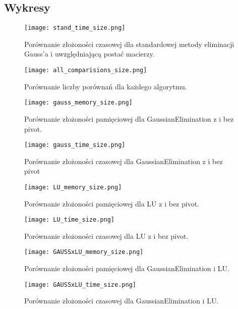 \documentclass[11pt]{article}
\begin{document}
\begin{flushleft}
\subsection{Wykresy}
\centering
\begin{figure}[H]
  \begin{minipage}[b]{.45\textwidth}
    \centering
    \texttt{[image: stand\_time\_size.png]}
    \caption{Porównanie złożoności czasowej dla standardowej metody eliminacji Gauss'a i uwzględniającą postać macierzy.}
  \end{minipage}
    \begin{minipage}[b]{.45\textwidth}
    \centering
    \texttt{[image: all\_comparisions\_size.png]}
    \caption{Porównanie liczby porównań dla każdego algorytmu.}
  \end{minipage}
  \begin{minipage}[b]{.45\textwidth}
    \centering
    \texttt{[image: gauss\_memory\_size.png]}
    \caption{Porównanie złożoności pamięciowej dla GaussianElimination z i bez pivot.}
  \end{minipage}\hfill
  \begin{minipage}[b]{.45\textwidth}
    \centering
    \texttt{[image: gauss\_time\_size.png]}
    \caption{Porównanie złożoności czasowej dla GaussianElimination z i bez pivot}
  \end{minipage}
  \begin{minipage}[b]{.45\textwidth}
    \centering
    \texttt{[image: LU\_memory\_size.png]}
    \caption{Porównanie złożoności pamięciowej dla  LU z i bez pivot.}
  \end{minipage}\hfill
  \begin{minipage}[b]{.45\textwidth}
    \centering
    \texttt{[image: LU\_time\_size.png]}
    \caption{Porównanie złożoności czasowej dla  LU z i bez pivot.}
  \end{minipage}
  \end{figure}
\begin{figure}[H]
  \begin{minipage}[b]{.45\textwidth}
    \centering
    \texttt{[image: GAUSSxLU\_memory\_size.png]}
    \caption{Porównanie złożoności pamięciowej dla GaussianElimination i LU.}
  \end{minipage}\hfill
  \begin{minipage}[b]{.45\textwidth}
    \centering
    \texttt{[image: GAUSSxLU\_time\_size.png]}
    \caption{Porównanie złożoności czasowej dla GaussianElimination i LU.}

\end{minipage}
\end{figure}
\end{flushleft}
\end{document}
